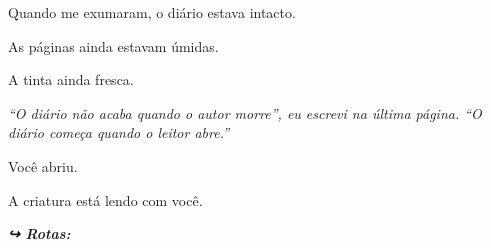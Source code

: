 \noindent Quando me exumaram, o diário estava intacto.

\noindent As páginas ainda estavam úmidas.

\noindent A tinta ainda fresca.

\noindent \textit{\textquotedblleft{}O diário não acaba quando o autor morre\textquotedblright{}\textit{, eu escrevi na última página. }\textquotedblleft{}O diário começa quando o leitor abre.\textquotedblright{}}

\noindent Você abriu.

\noindent A criatura está lendo com você.

\vspace{0.5em}
\noindent\textit{\textbf{↪ Rotas:}  \rotasep {} \rotasep {}}